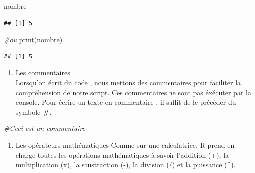 \documentclass[
]{article}
\newenvironment{Shaded}{\begin{snugshade}}{\end{snugshade}}
\newcommand{\CommentTok}[1]{\textcolor[rgb]{0.56,0.35,0.01}{\textit{#1}}}
\newcommand{\FunctionTok}[1]{\textcolor[rgb]{0.00,0.00,0.00}{#1}}
\newcommand{\NormalTok}[1]{#1}
\providecommand{\tightlist}{%
  \setlength{\itemsep}{0pt}\setlength{\parskip}{0pt}}
\begin{document}
\begin{Shaded}
\begin{Highlighting}[]
\NormalTok{nombre}
\end{Highlighting}
\end{Shaded}

\begin{verbatim}
## [1] 5
\end{verbatim}

\begin{Shaded}
\begin{Highlighting}[]
\CommentTok{\#ou}
\FunctionTok{print}\NormalTok{(nombre)}
\end{Highlighting}
\end{Shaded}

\begin{verbatim}
## [1] 5
\end{verbatim}

\begin{enumerate}
\def\labelenumi{\arabic{enumi}.}
\setcounter{enumi}{2}
\tightlist
\item
  Les commentaires\\
  Lorsqu'on écrit du code , nous mettons des commentaires pour faciliter
  la compréhension de notre script. Ces commentaires ne sont pas
  éxécuter par la console. Pour écrire un texte en commentaire , il
  suffit de le précéder du symbole \textbf{\#}.
\end{enumerate}

\begin{Shaded}
\begin{Highlighting}[]
\CommentTok{\#Ceci est un commentaire}
\end{Highlighting}
\end{Shaded}

\begin{enumerate}
\def\labelenumi{\arabic{enumi}.}
\setcounter{enumi}{3}
\tightlist
\item
  Les opérateurs mathématiques Comme sur une calculatrice, R prend en
  charge toutes les opérations mathématiques à savoir l'addition (+), la
  multiplication (x), la soustraction (-), la division (/) et la
  puissance (\^{}).
\end{enumerate}
\end{document}
